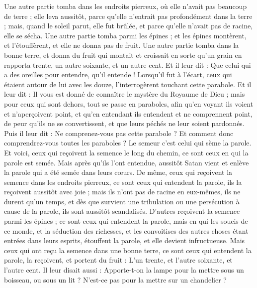 \begin{multicols}{2}
Une autre partie tomba dans les endroits pierreux, où elle n'avait pas beaucoup de terre ; elle leva aussitôt, parce qu'elle n'entrait pas profondément dans la terre ;
mais, quand le soleil parut, elle fut brûlée, et parce qu'elle n'avait pas de racine, elle se sécha.
Une autre partie tomba parmi les épines ; et les épines montèrent, et l'étouffèrent, et elle ne donna pas de fruit.
Une autre partie tomba dans la bonne terre, et donna du fruit qui montait et croissait en sorte qu'un grain en rapporta trente, un autre soixante, et un autre cent.
Et il leur dit : Que celui qui a des oreilles pour entendre, qu'il entende !
Lorsqu’il fut à l’écart, ceux qui étaient autour de lui avec les douze, l'interrogèrent touchant cette parabole.
Et il leur dit : Il vous est donné de connaître le mystère du Royaume de Dieu ; mais pour ceux qui sont dehors, tout se passe en paraboles,
afin qu'en voyant ils voient et n'aperçoivent point, et qu'en entendant ils entendent et ne comprennent point, de peur qu'ils ne se convertissent, et que leurs péchés ne leur soient pardonnés.
Puis il leur dit : Ne comprenez-vous pas cette parabole ? Et comment donc comprendrez-vous toutes les paraboles ?
Le semeur c'est celui qui sème la parole.
Et voici, ceux qui reçoivent la semence le long du chemin, ce sont ceux en qui la parole est semée. Mais après qu'ils l’ont entendue, aussitôt Satan vient et enlève la parole qui a été semée dans leurs cœurs.
De même, ceux qui reçoivent la semence dans les endroits pierreux, ce sont ceux qui entendent la parole, ils la reçoivent aussitôt avec joie ;
mais ils n'ont pas de racine en eux-mêmes, ils ne durent qu'un temps, et dès que survient une tribulation ou une persécution à cause de la parole, ils sont aussitôt scandalisés.
D’autres reçoivent la semence parmi les épines ; ce sont ceux qui entendent la parole,
mais en qui les soucis de ce monde, et la séduction des richesses, et les convoitises des autres choses étant entrées dans leurs esprits, étouffent la parole, et elle devient infructueuse.
Mais ceux qui ont reçu la semence dans une bonne terre, ce sont ceux qui entendent la parole, la reçoivent, et portent du fruit : L'un trente, et l'autre soixante, et l'autre cent.
Il leur disait aussi : Apporte-t-on la lampe pour la mettre sous un boisseau, ou sous un lit ? N'est-ce pas pour la mettre sur un chandelier ?

\end{multicols}
